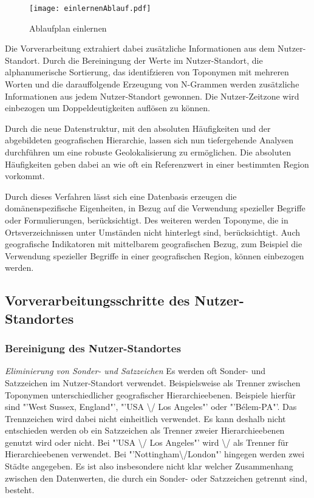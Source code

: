 			 \begin{figure}[!ht]
					\begin{center}
						\texttt{[image: einlernenAblauf.pdf]}
						\caption{Ablaufplan einlernen}
						\label{img:einlernenAblauf}
					\end{center}
				\end{figure}


			Die Vorverarbeitung extrahiert dabei zusätzliche Informationen aus dem Nutzer-Standort.
			Durch die Bereiningung der Werte im Nutzer-Standort, die alphanumerische Sortierung, das identifzieren von Toponymen mit mehreren Worten und die darauffolgende Erzeugung von N-Grammen werden zusätzliche Informationen aus jedem Nutzer-Standort gewonnen.
			Die Nutzer-Zeitzone wird einbezogen um Doppeldeutigkeiten auflösen zu können.

			Durch die neue Datenstruktur, mit den absoluten Häufigkeiten und der abgebildeten geografischen Hierarchie, lassen sich nun tiefergehende Analysen durchführen um eine robuste Geolokalisierung zu ermöglichen. 
			Die absoluten Häufigkeiten geben dabei an wie oft ein Referenzwert in einer bestimmten Region vorkommt.

			Durch dieses Verfahren lässt sich eine Datenbasis erzeugen die domänenspezifische Eigenheiten, in Bezug auf die Verwendung spezieller Begriffe oder Formulierungen, berücksichtigt.
			Des weiteren werden Toponyme, die in Ortsverzeichnissen unter Umständen nicht hinterlegt sind, berücksichtigt.
			Auch geografische Indikatoren mit mittelbarem geografischen Bezug, zum Beispiel die Verwendung spezieller Begriffe in einer geografischen Region, können einbezogen werden. 

		

		
		\subsection{Vorverarbeitungsschritte des Nutzer-Standortes}

			\subsubsection{Bereinigung des Nutzer-Standortes}

				\textit{Eliminierung von Sonder- und Satzzeichen} 
				Es werden oft Sonder- und Satzzeichen im Nutzer-Standort verwendet. 
				Beispielsweise als Trenner zwischen Toponymen unterschiedlicher geografischer Hierarchieebenen.
				Beispiele hierfür sind "'West Sussex, England"', "'USA \textbackslash/ Los Angeles"' oder "'Bélem-PA"'.
				Das Trennzeichen wird dabei nicht einheitlich verwendet.  
				Es kann deshalb nicht entschieden werden ob ein Satzzeichen als Trenner zweier Hierarchieebenen genutzt wird oder nicht.
				Bei "'USA \textbackslash/ Los Angeles"' wird \textbackslash/ als Trenner für Hierarchieebenen verwendet.
				Bei "'Nottingham\textbackslash/London"' hingegen werden zwei Städte angegeben.
				Es ist also insbesondere nicht klar welcher Zusammenhang zwischen den Datenwerten, die durch ein Sonder- oder Satzzeichen getrennt sind, besteht. 

